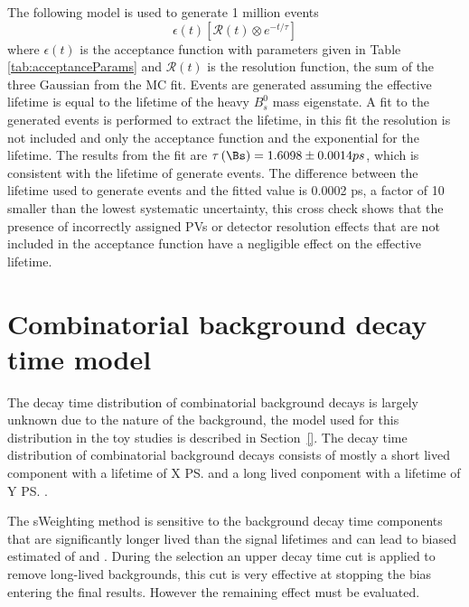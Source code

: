 {The following model is used to generate 1 million events
\begin{equation}
\epsilon (t) [\mathcal{R}(t) \otimes e^{-t/\tau}]
\end{equation}
where $\epsilon (t)$ is the acceptance function with parameters given in Table \ref{tab:acceptanceParams} and $\mathcal{R}(t)$ is the resolution function, the sum of the three Gaussian from the MC fit. Events are generated assuming the \bsmumu effective lifetime is equal to the lifetime of the heavy $B^{0}_{s}$ mass eigenstate. A fit to the generated events is performed to extract the lifetime, in this fit the resolution is not included and only the acceptance function and the exponential for the lifetime. The results from the fit are $\tau\left(\Bs\right) = 1.6098\pm 0.0014 \ps$, which is consistent with the lifetime of generate events. The difference between the lifetime used to generate events and the fitted value is 0.0002 ps, a factor of 10 smaller than the lowest systematic uncertainty, this cross check shows that the presence of incorrectly assigned PVs or detector resolution effects that are not included in the acceptance function have a negligible effect on the \bsmumu effective lifetime.


\section{Combinatorial background decay time model}
\label{sec:CBGdecytimemodel}

The decay time distribution of combinatorial background decays is largely unknown due to the nature of the background, the model used for this distribution in the toy studies is described in Section~\ref{}. The decay time distribution of combinatorial background decays consists of mostly a short lived component with a lifetime of X \ps and a long lived conpoment with a lifetime of Y \ps.

The sWeighting method is sensitive to the background decay time components that are significantly longer lived than the signal lifetimes and can lead to biased estimated of \tmumu and \Gmumu. 
During the selection an upper decay time cut is applied to remove long-lived backgrounds, this cut is very effective at stopping the bias entering the final results. However the remaining effect must be evaluated.

}
